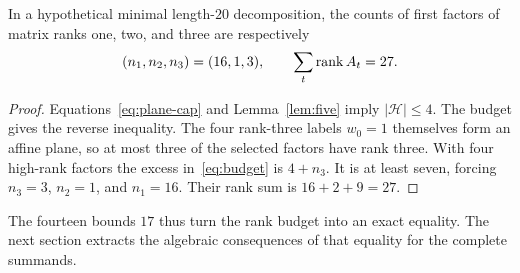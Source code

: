 \begin{proposition}\label{prop:profile}
In a hypothetical minimal length-$20$ decomposition, the counts of first
factors of matrix ranks one, two, and three are respectively
\begin{equation}\label{eq:profile}
 (n_1,n_2,n_3)=(16,1,3),\qquad
 \sum_t\operatorname{rank} A_t=27.
\end{equation}
\end{proposition}
\begin{proof}
Equations~\eqref{eq:plane-cap} and Lemma~\ref{lem:five} imply
$|\mathcal H|\leq4$. The budget gives the reverse inequality.
The four rank-three labels $w_0=1$ themselves form an affine plane,
so at most three of the selected factors have rank three. With four
high-rank factors the excess in~\eqref{eq:budget} is $4+n_3$.
It is at least seven, forcing $n_3=3$, $n_2=1$, and $n_1=16$.
Their rank sum is $16+2+9=27$.
\end{proof}

The fourteen bounds $17$ thus turn the rank budget into an exact
equality. The next section extracts the algebraic consequences of that
equality for the complete summands.
